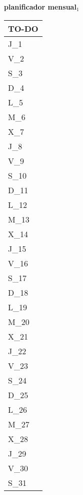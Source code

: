 \clearpage
{\raggedright
	\fontsize{25}{50}\selectfont
	\textbf{\NextYear}
}\scriptsize{\textbf{planificador mensual$_1$}}\\[11.3pt]



	\noindent\dotfill
	\renewcommand{\arraystretch}{1.5}\scriptsize
		\begin{longtabu} to \textwidth { X[l]}
		\centering \small{\textbf{TO-DO}} \\
		\toprule
		J_{1} \dotfill\\
		V_{2} \dotfill\\
		S_{3} \dotfill\\
		D_{4} \dotfill\\
		\hline
		L_{5} \dotfill\\
		M_{6} \dotfill\\
		X_{7} \dotfill\\
		J_{8} \dotfill\\
		V_{9} \dotfill\\
		S_{10} \dotfill\\
		D_{11} \dotfill\\
		\hline
		L_{12} \dotfill\\
		M_{13} \dotfill\\
		X_{14} \dotfill\\
		J_{15} \dotfill\\
		V_{16} \dotfill\\
		S_{17} \dotfill\\
		D_{18} \dotfill\\
		\hline
		L_{19} \dotfill\\
		M_{20} \dotfill\\
		X_{21} \dotfill\\
		J_{22} \dotfill\\
		V_{23} \dotfill\\
		S_{24} \dotfill\\
		D_{25} \dotfill\\
		\hline
		L_{26} \dotfill\\
		M_{27} \dotfill\\
		X_{28} \dotfill\\
		J_{29} \dotfill\\
		V_{30} \dotfill\\
		S_{31} \dotfill\\

		\bottomrule

	\end{longtabu}


\clearpage
